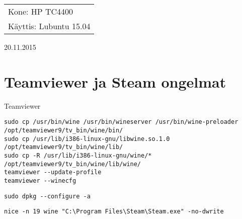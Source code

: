 \documentclass[main.tex]{subfiles}
\begin{document}
\thispagestyle{empty}
\begin{tabular}[t]{l}
Kone: HP TC4400\\
Käyttis: Lubuntu 15.04
\end{tabular}
\hfill 20.11.2015

{\section{Teamviewer ja Steam ongelmat}}

Teamviewer

\begin{lstlisting}
sudo cp /usr/bin/wine /usr/bin/wineserver /usr/bin/wine-preloader /opt/teamviewer9/tv_bin/wine/bin/
sudo cp /usr/lib/i386-linux-gnu/libwine.so.1.0 /opt/teamviewer9/tv_bin/wine/lib/
sudo cp -R /usr/lib/i386-linux-gnu/wine/* /opt/teamviewer9/tv_bin/wine/lib/wine/
teamviewer --update-profile
teamviewer --winecfg
\end{lstlisting}

\begin{lstlisting}
sudo dpkg --configure -a
\end{lstlisting}

\begin{lstlisting}
nice -n 19 wine "C:\Program Files\Steam\Steam.exe" -no-dwrite
\end{lstlisting}
\end{document}
